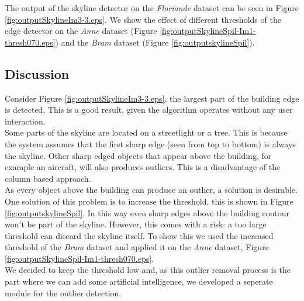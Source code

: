The output of the skyline detector on the \emph{Floriande}
dataset \cite{Fit3d} can be seen in Figure \ref{fig:outputSkylineIm3-3.eps}.
We show the effect of different thresholds of the edge detector on the
\emph{Anne} dataset (Figure \ref{fig:outputSkylineSpil-Im1-thresh070.eps})
and the 
\emph{Bram} dataset (Figure \ref{fig:outputskylineSpil}). 

\clearpage
{}
\clearpage
{}
\clearpage

\subsection{Discussion}  %
Consider Figure \ref{fig:outputSkylineIm3-3.eps}, the largest part of the
building edge is detected. This is a good result, given the algorithm
operates without any user interaction.\\

Some parts of the skyline are located on a streetlight or a tree.  This is
because the system assumes that the first sharp edge (seen from top to bottom)
is always the skyline.  Other sharp edged objects that appear above the
building, for example an aircraft, will also produces outliers. This is a
disadvantage of the column based approach.\\

As every object above the building can produce an outlier, a solution is
desirable. One solution of this problem is to increase the threshold, this is shown in Figure \ref{fig:outputskylineSpil}.
In this way even sharp edges above the building contour won't be part of the
skyline. However, this comes with a risk: a too large threshold can discard the
skyline itself. To show this we used the increased threshold of the \emph{Bram} dataset
and applied it on the \emph{Anne} dataset, Figure
\ref{fig:outputSkylineSpil-Im1-thresh070.eps}.\\

We decided to keep the threshold low and, as this outlier removal process is the
part where we can add some artificial intelligence, we developed a seperate
module for the outlier detection.


